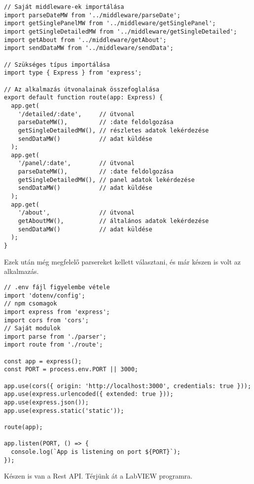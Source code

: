 \begin{verbatim}
// Saját middleware-ek importálása
import parseDateMW from '../middleware/parseDate';
import getSinglePanelMW from '../middleware/getSinglePanel';
import getSingleDetailedMW from '../middleware/getSingleDetailed';
import getAbout from '../middleware/getAbout';
import sendDataMW from '../middleware/sendData';

// Szükséges típus importálása
import type { Express } from 'express';

// Az alkalmazás útvonalainak összefoglalása
export default function route(app: Express) {
  app.get(
    '/detailed/:date',     // útvonal
    parseDateMW(),         // :date feldolgozása
    getSingleDetailedMW(), // részletes adatok lekérdezése
    sendDataMW()           // adat küldése
  );
  app.get(
    '/panel/:date',        // útvonal
    parseDateMW(),         // :date feldolgozása
    getSingleDetailedMW(), // panel adatok lekérdezése
    sendDataMW()           // adat küldése
  );
  app.get(
    '/about',              // útvonal
    getAboutMW(),          // általános adatok lekérdezése
    sendDataMW()           // adat küldése
  );
}
\end{verbatim}

Ezek után még megfelelő parsereket kellett választani, és már készen is
volt az alkalmazás.
\begin{verbatim}
// .env fájl figyelembe vétele
import 'dotenv/config';
// npm csomagok
import express from 'express';
import cors from 'cors';
// Saját modulok
import parse from './parser';
import route from './route';

const app = express();
const PORT = process.env.PORT || 3000;

app.use(cors({ origin: 'http://localhost:3000', credentials: true }));
app.use(express.urlencoded({ extended: true }));
app.use(express.json());
app.use(express.static('static'));

route(app);

app.listen(PORT, () => {
  console.log(`App is listening on port ${PORT}`);
});
\end{verbatim}

Készen is van a Rest API. Térjünk át a LabVIEW programra.
